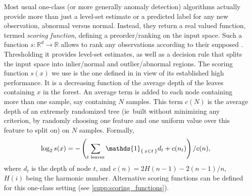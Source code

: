 Most usual one-class (or more generally anomaly detection) algorithms actually
provide more than just a level-set estimate or a predicted label for any new
observation, abnormal versus normal. Instead, they return a real valued
function, termed \emph{scoring function}, defining a preorder/ranking on the
input space. Such a function $s: \mathbb{R}^d \to \mathbb{R}$ allows to rank
any observations according to their supposed .
Thresholding it provides level-set estimates, as well as a decision rule that
splits the input space into inlier/normal and outlier/abnormal regions.
%
%
The scoring function $s(x)$ we use is the one defined in \citet{Liu2008} in
view of its established high performance. It is a decreasing function of the
average depth of the leaves containing $x$ in the forest.
An average term is added to each node containing more than one sample, say
containing $N$ samples. This term $c(N)$ is the average depth of an extremely
randomized tree \citep{Geurts2006} (\acs{ie}~built without minimizing any
criterion, by randomly choosing one feature and one uniform value over this
feature to split on) on $N$ samples. Formally,
\begin{dmath}
    \label{ocrf:eq:scoring3}
    \log_2 s(x) = -\left(\sum_{t \text{~leaves}} \mathds{1}_{\Set{x \in t}} d_t
    + c(n_t)\right) / c(n),
\end{dmath}
where $d_t$ is the depth of node $t$, and $c(n) = 2H(n - 1) - 2(n - 1)/n$,
$H(i)$ being the harmonic number. Alternative scoring functions can be defined
for this one-class setting (see \cref{supp:scoring_functions}).
%
%
%
